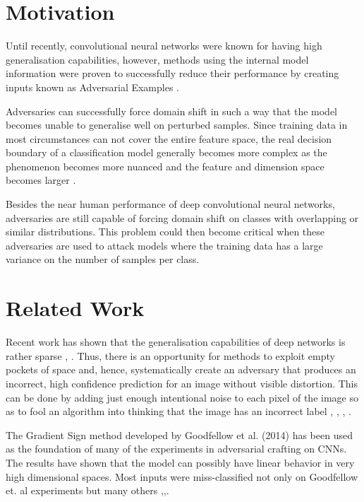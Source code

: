 \documentclass[runningheads,a4paper]{llncs}
\begin{document}
\section{Motivation}

Until recently, convolutional neural networks were known for having high generalisation capabilities, however, methods using the internal model information were proven to successfully reduce their performance by creating inputs known as Adversarial Examples \cite{goodfellow2014}.

Adversaries can successfully force domain shift in such a way that the model becomes unable to generalise well on perturbed samples. Since training data in most circumstances can not cover the entire feature space, the real decision boundary of a classification model generally becomes more complex as the phenomenon becomes more nuanced and the feature and dimension space becomes larger \cite{goodfellow2016_book}.

Besides the near human performance of deep convolutional neural networks, adversaries are still capable of forcing domain shift on classes with overlapping or similar distributions. This problem could then become critical when these adversaries are used to attack models where the training data has a large variance on the number of samples per class. 

\section{Related Work}

Recent work has shown that the generalisation capabilities of deep networks is rather sparse \cite{goodfellow2016}, \cite{papernot2016transf}. Thus, there is an opportunity for methods to exploit empty pockets of space and, hence, systematically create an adversary that produces an incorrect, high confidence prediction for an image without visible distortion. This can be done by adding just enough intentional noise to each pixel of the image so as to fool an algorithm into thinking that the image has an incorrect label \cite{goodfellow2014}, \cite{goodfellow2016}, \cite{papernot2016transf}, \cite{szegedy2013}.

The Gradient Sign method developed by Goodfellow et al. (2014) has been used as the foundation of many of the experiments in adversarial crafting on CNNs. The results have shown that the model can possibly have linear behavior in very high dimensional spaces.  Most inputs were miss-classified not only on Goodfellow et. al \cite{goodfellow2014}  experiments but many others \cite{billovits},\cite{goodfellow2016},\cite{papernot2016}.
\end{document}
